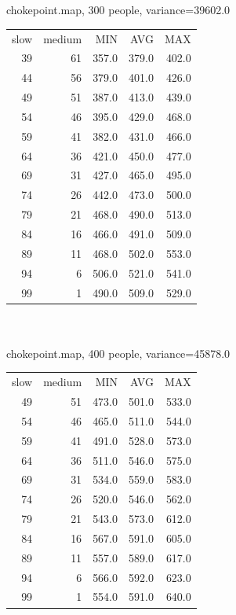 \documentclass[12pt,letterpaper]{article}
\begin{document}
\\
\\
chokepoint.map, 300 people, variance=39602.0
\begin{tabular}{ r | r | r | r | r }
slow & medium & MIN   & AVG   & MAX \\
39 & 61 & 357.0 & 379.0 & 402.0 \\
44 & 56 & 379.0 & 401.0 & 426.0 \\
49 & 51 & 387.0 & 413.0 & 439.0 \\
54 & 46 & 395.0 & 429.0 & 468.0 \\
59 & 41 & 382.0 & 431.0 & 466.0 \\
64 & 36 & 421.0 & 450.0 & 477.0 \\
69 & 31 & 427.0 & 465.0 & 495.0 \\
74 & 26 & 442.0 & 473.0 & 500.0 \\
79 & 21 & 468.0 & 490.0 & 513.0 \\
84 & 16 & 466.0 & 491.0 & 509.0 \\
89 & 11 & 468.0 & 502.0 & 553.0 \\
94 &  6 & 506.0 & 521.0 & 541.0 \\
99 &  1 & 490.0 & 509.0 & 529.0 \\
\end{tabular}  
\\
\\
chokepoint.map, 400 people, variance=45878.0
\begin{tabular}{ r | r | r | r | r }
slow & medium & MIN   & AVG   & MAX \\
49 & 51 & 473.0 & 501.0 & 533.0 \\
54 & 46 & 465.0 & 511.0 & 544.0 \\
59 & 41 & 491.0 & 528.0 & 573.0 \\
64 & 36 & 511.0 & 546.0 & 575.0 \\
69 & 31 & 534.0 & 559.0 & 583.0 \\
74 & 26 & 520.0 & 546.0 & 562.0 \\
79 & 21 & 543.0 & 573.0 & 612.0 \\
84 & 16 & 567.0 & 591.0 & 605.0 \\
89 & 11 & 557.0 & 589.0 & 617.0 \\
94 &  6 & 566.0 & 592.0 & 623.0 \\
99 &  1 & 554.0 & 591.0 & 640.0 \\
\end{tabular}  
\\                                     
\\
\end{document}
